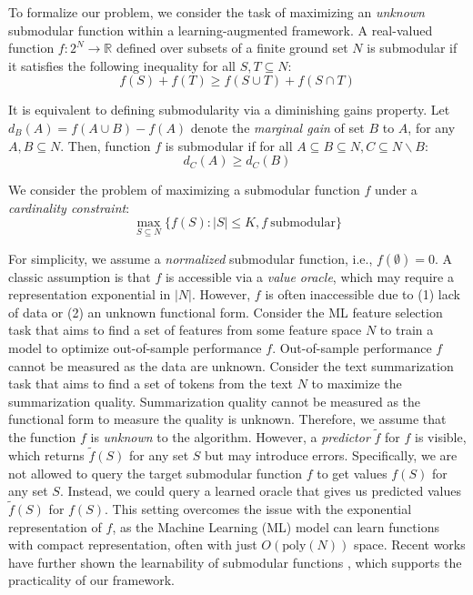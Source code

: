 To formalize our problem, we consider the task of maximizing an \textit{unknown} submodular function within a learning-augmented framework. A real-valued function $f: 2^N \rightarrow \mathbb{R}$ defined over subsets of a finite ground set $N$ is submodular if it satisfies the following inequality for all $S, T \subseteq N$:
\[ f(S) + f(T) \geq f(S \cup T) + f(S \cap T) \]

It is equivalent to defining submodularity via a diminishing gains property. Let $d_B(A) = f(A \cup B) - f(A)$ denote the \textit{marginal gain} of set $B$ to $A$, for any $A, B \subseteq N$. Then, function $f$ is submodular if for all $A \subseteq B \subseteq N, C \subseteq N \backslash B$: 
\[ d_{C}(A) \geq d_{C}(B) \]

We consider the problem of maximizing a submodular function $f$ under a \textit{cardinality constraint}: 
\begin{equation} \label{problem}
\max_{S \subseteq N}\{ f(S): |S| \leq K, f ~\text{submodular} \}
\end{equation}

For simplicity, we assume a \textit{normalized} submodular function, i.e., $f(\emptyset) = 0$. 
A classic assumption is that $f$ is accessible via a \textit{value oracle}, which may require a representation exponential in $|N|$. However, $f$ is often inaccessible due to (1) lack of data or (2) an unknown functional form. Consider the ML feature selection task that aims to find a set of features from some feature space $N$ to train a model to optimize out-of-sample performance $f$. Out-of-sample performance $f$ cannot be measured as the data are unknown. Consider the text summarization task that aims to find a set of tokens from the text $N$ to maximize the summarization quality. Summarization quality cannot be measured as the functional form to measure the quality is unknown. Therefore, we assume that the function $f$ is \textit{unknown} to the algorithm. However, a \textit{predictor} $\tilde{f}$ for $f$ is visible, which returns $\tilde{f}(S)$ for any set $S$ but may introduce errors. Specifically, we are not allowed to query the target submodular function $f$ to get values $f(S)$ for any set $S$. Instead, we could query a learned oracle that gives us predicted values $\tilde{f}(S)$ for $f(S)$. 
This setting overcomes the issue with the exponential representation of $f$, as the Machine Learning (ML) model can learn functions with compact representation, often with just $O(\text{poly}(N))$ space. Recent works have further shown the learnability of submodular functions \cite{approxSubmodularFunctions,learnValueFunctions,representationApproxLearnSubmodularFunctions,submodularFunctionsLearn}, which supports the practicality of our framework.



